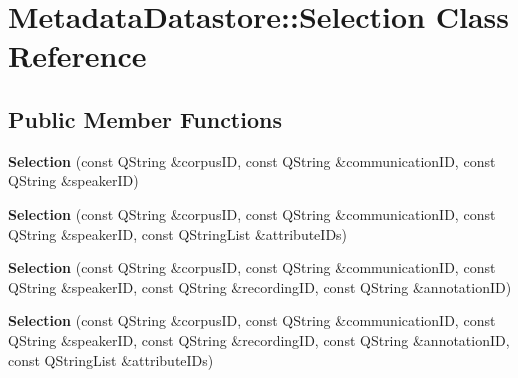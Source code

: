 \hypertarget{class_metadata_datastore_1_1_selection}{}\section{Metadata\+Datastore\+:\+:Selection Class Reference}
\label{class_metadata_datastore_1_1_selection}
\subsection*{Public Member Functions}
\begin{DoxyCompactItemize}
\item 
\mbox{\label{class_metadata_datastore_1_1_selection_a4f2ef65a8403bb81c94d93034856365a}} 
{\bfseries Selection} (const Q\+String \&corpus\+ID, const Q\+String \&communication\+ID, const Q\+String \&speaker\+ID)
\item 
\mbox{\label{class_metadata_datastore_1_1_selection_af03f40277eee82d0bc1e7529dea118e0}} 
{\bfseries Selection} (const Q\+String \&corpus\+ID, const Q\+String \&communication\+ID, const Q\+String \&speaker\+ID, const Q\+String\+List \&attribute\+I\+Ds)
\item 
\mbox{\label{class_metadata_datastore_1_1_selection_ab386d496cec69857d4c6721f8af45633}} 
{\bfseries Selection} (const Q\+String \&corpus\+ID, const Q\+String \&communication\+ID, const Q\+String \&speaker\+ID, const Q\+String \&recording\+ID, const Q\+String \&annotation\+ID)
\item 
\mbox{\label{class_metadata_datastore_1_1_selection_aed8cfc763c43ee84afd08788011d9da9}} 
{\bfseries Selection} (const Q\+String \&corpus\+ID, const Q\+String \&communication\+ID, const Q\+String \&speaker\+ID, const Q\+String \&recording\+ID, const Q\+String \&annotation\+ID, const Q\+String\+List \&attribute\+I\+Ds)
\end{DoxyCompactItemize}
